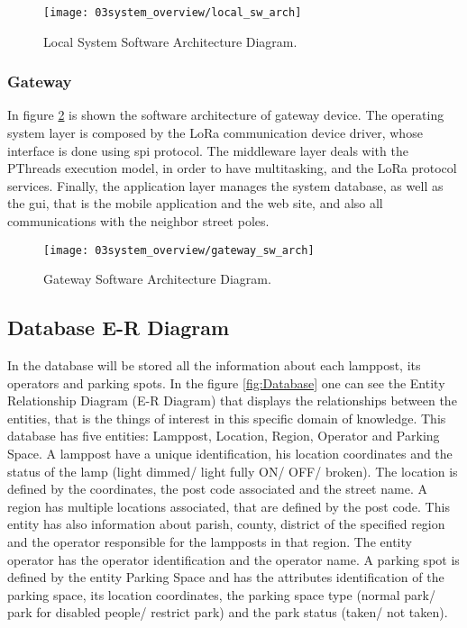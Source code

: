 \begin{figure}[H]
	\centering
	\texttt{[image: 03system\_overview/local\_sw\_arch]}
	\caption{Local System Software Architecture Diagram.}
	\label{fig:local_sw_arch}
\end{figure}

\subsubsection{Gateway}

In figure \ref{fig:gateway_sw_arch} is shown the software architecture of gateway device. The operating system layer is composed by the LoRa communication device driver, whose interface is done using \ac{spi} protocol. The middleware layer deals with the PThreads execution model, in order to have multitasking, and the LoRa protocol services. Finally, the application layer manages the system database, as well as the \ac{gui}, that is the mobile application and the web site, and also all communications with the neighbor street poles.

\begin{figure}[H]
	\centering
	\texttt{[image: 03system\_overview/gateway\_sw\_arch]}
	\caption{Gateway Software Architecture Diagram.}
	\label{fig:gateway_sw_arch}
\end{figure}

\clearpage
\subsection{Database E-R Diagram}
In the database will be stored all the information about each lamppost, its operators and parking spots. In the figure \ref{fig:Database} one can see the Entity Relationship Diagram (E-R Diagram) that displays the relationships between the entities, that is the things of interest in this specific domain of knowledge. This database has five entities: Lamppost, Location, Region, Operator and Parking Space. A lamppost have a unique identification, his location coordinates and the status of the lamp (light dimmed/ light fully ON/ OFF/ broken). The location is defined by the coordinates, the post code associated and the street name. A region has multiple locations associated, that are defined by the post code. This entity has also information about parish, county, district of the specified region and the operator responsible for the lampposts in that region. The entity operator has the operator identification and the operator name. A parking spot is defined by the entity Parking Space and has the attributes identification of the parking space, its location coordinates, the parking space type (normal park/ park for disabled people/ restrict park) and the park status (taken/ not taken).

